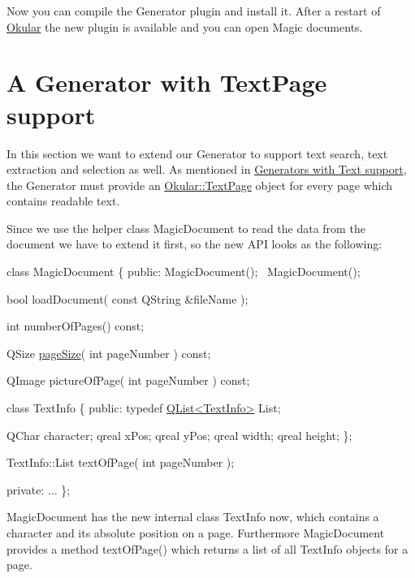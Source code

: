 Now you can compile the Generator plugin and install it. After a restart of \hyperlink{namespaceOkular}{Okular} the new plugin is available and you can open Magic documents.\hypertarget{okular_generators_okular_generators_with_text}{}\section{A Generator with Text\+Page support}\label{okular_generators_okular_generators_with_text}
In this section we want to extend our Generator to support text search, text extraction and selection as well. As mentioned in \hyperlink{okular_design_okular_design_text_support}{Generators with Text support}, the Generator must provide an \hyperlink{classOkular_1_1TextPage}{Okular\+::\+Text\+Page} object for every page which contains readable text.

Since we use the helper class Magic\+Document to read the data from the document we have to extend it first, so the new A\+P\+I looks as the following\+:


\begin{DoxyCode}
\textcolor{keyword}{class }MagicDocument
\{
    \textcolor{keyword}{public}:
        MagicDocument();
        ~MagicDocument();

        \textcolor{keywordtype}{bool} loadDocument( \textcolor{keyword}{const} QString &fileName );

        \textcolor{keywordtype}{int} numberOfPages() \textcolor{keyword}{const};

        QSize \hyperlink{classpageSize}{pageSize}( \textcolor{keywordtype}{int} pageNumber ) \textcolor{keyword}{const};

        QImage pictureOfPage( \textcolor{keywordtype}{int} pageNumber ) \textcolor{keyword}{const};

        \textcolor{keyword}{class }TextInfo
        \{
            \textcolor{keyword}{public}:
                \textcolor{keyword}{typedef} \hyperlink{classQList}{QList<TextInfo>} List;

                QChar character;
                qreal xPos;
                qreal yPos;
                qreal width;
                qreal height;
        \};

        TextInfo::List textOfPage( \textcolor{keywordtype}{int} pageNumber );

    \textcolor{keyword}{private}:
        ...
\};
\end{DoxyCode}


Magic\+Document has the new internal class Text\+Info now, which contains a character and its absolute position on a page. Furthermore Magic\+Document provides a method text\+Of\+Page() which returns a list of all Text\+Info objects for a page.

